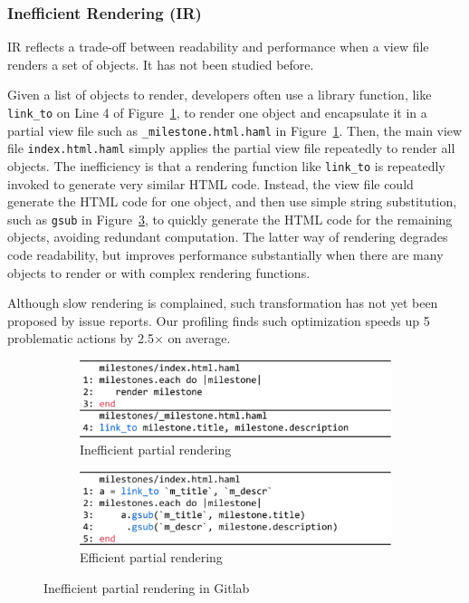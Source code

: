 \subsubsection{Inefficient Rendering (IR)}
\label{sec:iffirender}
IR reflects a trade-off between readability and performance when a view file renders a set of objects. It has not been studied before.

Given a list of objects to render, developers often 
use a library function, like \texttt{link\_to} on Line 4 of Figure~\ref{fig:partialA},
to render one object and encapsulate it in a partial view file
such as \texttt{\_milestone.html.haml} in Figure~\ref{fig:partialA}.
Then, the main view file \texttt{index.html.haml} simply applies the
partial view file repeatedly to render all objects. 
The inefficiency is that a rendering function like \texttt{link\_to}
is repeatedly invoked to generate very similar HTML code. Instead,
the view file could generate the HTML code for one object,
and then use simple string substitution, 
such as \texttt{gsub} in Figure~\ref{fig:partialB}, to quickly 
generate the HTML code for the remaining objects, avoiding redundant
computation. The latter way of
rendering degrades code readability, but improves performance substantially
when there are many objects to render or with complex rendering functions.

Although slow rendering is complained, such transformation has not yet been proposed by issue reports. Our profiling finds such optimization speeds up 5 problematic actions by 2.5$\times$ on average.

\begin{figure}
\centering
\label{fig:sl}
    \begin{subfigure}
    \centering
        \includegraphics[width=0.4\linewidth]{hownotto/partialA.pdf}
       \caption{Inefficient partial rendering}
         \label{fig:partialA}
    \end{subfigure}
    \begin{subfigure}
        \centering
        \includegraphics[width=0.4\linewidth]{hownotto/partialB.pdf}
       \caption{Efficient partial rendering}
        \label{fig:partialB} 
    \end{subfigure}
\caption{Inefficient partial rendering in Gitlab}
\end{figure}

